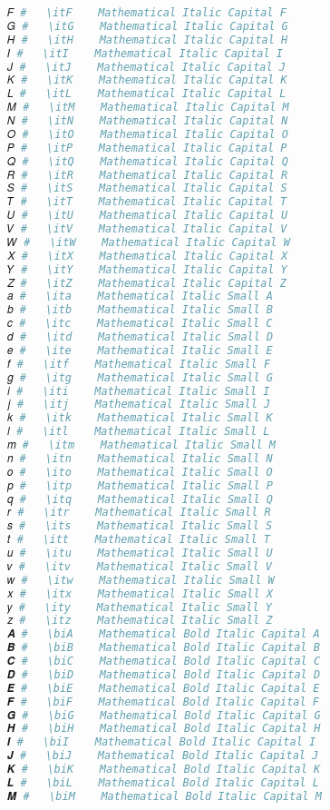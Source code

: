 \begin{lstlisting}[language=Julia]
𝐹 #   \itF    Mathematical Italic Capital F
𝐺 #   \itG    Mathematical Italic Capital G
𝐻 #   \itH    Mathematical Italic Capital H
𝐼 #   \itI    Mathematical Italic Capital I
𝐽 #   \itJ    Mathematical Italic Capital J
𝐾 #   \itK    Mathematical Italic Capital K
𝐿 #   \itL    Mathematical Italic Capital L
𝑀 #   \itM    Mathematical Italic Capital M
𝑁 #   \itN    Mathematical Italic Capital N
𝑂 #   \itO    Mathematical Italic Capital O
𝑃 #   \itP    Mathematical Italic Capital P
𝑄 #   \itQ    Mathematical Italic Capital Q
𝑅 #   \itR    Mathematical Italic Capital R
𝑆 #   \itS    Mathematical Italic Capital S
𝑇 #   \itT    Mathematical Italic Capital T
𝑈 #   \itU    Mathematical Italic Capital U
𝑉 #   \itV    Mathematical Italic Capital V
𝑊 #   \itW    Mathematical Italic Capital W
𝑋 #   \itX    Mathematical Italic Capital X
𝑌 #   \itY    Mathematical Italic Capital Y
𝑍 #   \itZ    Mathematical Italic Capital Z
𝑎 #   \ita    Mathematical Italic Small A
𝑏 #   \itb    Mathematical Italic Small B
𝑐 #   \itc    Mathematical Italic Small C
𝑑 #   \itd    Mathematical Italic Small D
𝑒 #   \ite    Mathematical Italic Small E
𝑓 #   \itf    Mathematical Italic Small F
𝑔 #   \itg    Mathematical Italic Small G
𝑖 #   \iti    Mathematical Italic Small I
𝑗 #   \itj    Mathematical Italic Small J
𝑘 #   \itk    Mathematical Italic Small K
𝑙 #   \itl    Mathematical Italic Small L
𝑚 #   \itm    Mathematical Italic Small M
𝑛 #   \itn    Mathematical Italic Small N
𝑜 #   \ito    Mathematical Italic Small O
𝑝 #   \itp    Mathematical Italic Small P
𝑞 #   \itq    Mathematical Italic Small Q
𝑟 #   \itr    Mathematical Italic Small R
𝑠 #   \its    Mathematical Italic Small S
𝑡 #   \itt    Mathematical Italic Small T
𝑢 #   \itu    Mathematical Italic Small U
𝑣 #   \itv    Mathematical Italic Small V
𝑤 #   \itw    Mathematical Italic Small W
𝑥 #   \itx    Mathematical Italic Small X
𝑦 #   \ity    Mathematical Italic Small Y
𝑧 #   \itz    Mathematical Italic Small Z
𝑨 #   \biA    Mathematical Bold Italic Capital A
𝑩 #   \biB    Mathematical Bold Italic Capital B
𝑪 #   \biC    Mathematical Bold Italic Capital C
𝑫 #   \biD    Mathematical Bold Italic Capital D
𝑬 #   \biE    Mathematical Bold Italic Capital E
𝑭 #   \biF    Mathematical Bold Italic Capital F
𝑮 #   \biG    Mathematical Bold Italic Capital G
𝑯 #   \biH    Mathematical Bold Italic Capital H
𝑰 #   \biI    Mathematical Bold Italic Capital I
𝑱 #   \biJ    Mathematical Bold Italic Capital J
𝑲 #   \biK    Mathematical Bold Italic Capital K
𝑳 #   \biL    Mathematical Bold Italic Capital L
𝑴 #   \biM    Mathematical Bold Italic Capital M

\end{lstlisting}

